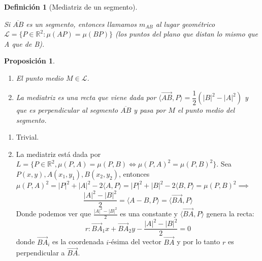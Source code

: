 \documentclass[11pt, a4paper]{article}
\makeatletter
\newif\IfInSansMode
\let\oldsf\sffamily
\renewcommand*{\sffamily}{\oldsf\mathversion{sans}\InSansModetrue}
\let\oldnorm\normalfont
\renewcommand*{\normalfont}{\oldnorm\InSansModefalse\mathversion{normal}}
\renewenvironment{proof}[1][\proofname] {\vspace{-15pt}\par\pushQED{\qed}\normalfont\topsep6\p@\@plus6\p@\relax\trivlist\item[\hskip\labelsep\it#1\@addpunct{.}]\ignorespaces}{\popQED\endtrivlist\@endpefalse}
\newcommand{\R}{\mathbb{R}}
\renewcommand{\vec}{\overrightarrow}
\renewenvironment{proof}[1][\proofname] {\par\pushQED{\qed}\normalfont\topsep6\p@\@plus6\p@\relax\trivlist\item[\hskip\labelsep\itshape\sffamily#1\@addpunct{.}]\ignorespaces}{\popQED\endtrivlist\@endpefalse}
\theoremstyle{theorem-style}
\newtheorem{nprop}{Proposición}[section]
\theoremstyle{definition-style}
\newtheorem{ndef}{Definición}[section]
\theoremstyle{remark-style}
\theoremstyle{example-style}
\newenvironment{nlist}
{\begin{enumerate}
    \renewcommand\labelenumi{(\emph{\roman{enumi})}}}
  {\end{enumerate}}
\makeatother
\begin{document}
\begin{ndef}[Mediatriz de un segmento] \hfill\\
\begin{minipage}[c]{0.70\textwidth}
  Si $\overline{AB}$ es un segmento, entonces llamamos $m_{AB}$  al lugar geométrico $\mathcal{L}=\{P \in \R^2 : \mu(AP) = \mu(BP)\}$ (los puntos del plano que distan lo mismo que A que de B).
\end{minipage}
\begin{minipage}[]{0.27\textwidth}
  \begin{center}
  \sffamily
\end{center}
\end{minipage}
\end{ndef}

\begin{nprop}\hfill
  \begin{nlist}
    \item El punto medio $M \in \mathcal{L}$. 
    \item La mediatriz es una recta que viene dada por $\langle\vec{AB},P\rangle  = \dfrac{1}{2}(|B|^2-|A|^2)$ y que es perpendicular al segmento $\overline{AB}$ y pasa por $M$ el punto medio del segmento.
  \end{nlist}
\end{nprop}

\begin{proof}\hfill
  \begin{nlist}
    \item Trivial.
    \item La mediatriz está dada por $L = \{P\in\mathbb{R}^2, \mu(P,A) = \mu(P,B)\iff \mu(P,A)^2 = \mu(P,B)^2\}$. Sea $P(x,y),A(x_1,y_1),B(x_2,y_2)$, entonces $\mu(P,A)^2 = |P|^2+|A|^2-2\langle A,P\rangle  = |P|^2+|B|^2-2\langle B,P\rangle = \mu(P,B)^2 \implies$ $$ \frac{|A|^2-|B|^2}{2} =\langle A-B,P\rangle  = \langle\vec{BA},P\rangle $$
    Donde podemos ver que $\frac{|A|^2-|B|^2}{2}$ es una constante y $\langle\vec{BA},P\rangle $ genera la recta:
    \[
      r: \vec{BA}_1x+ \vec{BA}_2y - \frac{|A|^2-|B|^2}{2} = 0
    \]
    donde $\vec{BA}_i$ es la coordenada $i$-ésima del vector $\vec{BA}$ y por lo tanto $r$ es perpendicular a $\vec{BA}$.
  \end{nlist}
\end{proof}
\end{document}
